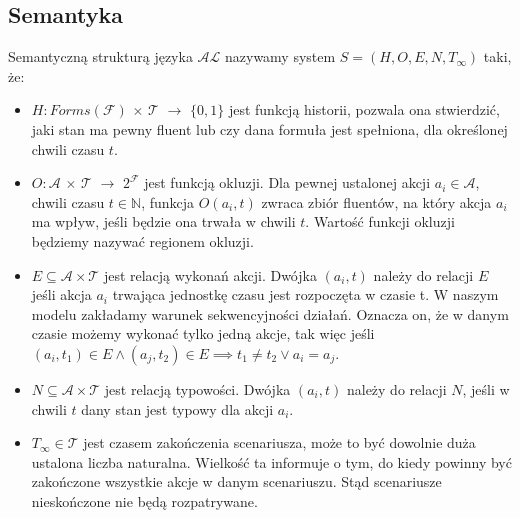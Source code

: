 \subsection{Semantyka}
\begin{definition}
Semantyczną strukturą języka $\mathcal{AL}$ nazywamy system $ S=(H,O,E,N,T_{\infty }) $ taki, że:
	\begin{itemize}
		\item $ H: Forms(\mathcal{F}) $ $\times$ $ \mathcal{T}$ $\longrightarrow$ $\{0,1\}$ jest funkcją historii,
		pozwala ona stwierdzić, jaki stan ma pewny fluent lub czy dana formuła jest spełniona, dla określonej chwili czasu $t$.
		\item $ O: \mathcal{A}$ $\times$ $ \mathcal{T}$ $\longrightarrow$ $2^{\mathcal{F}}$ jest funkcją okluzji.
		Dla pewnej ustalonej akcji $a_i \in \mathcal{A}$, chwili czasu $t\in\mathbb{N}$, funkcja $O(a_i,t) $ zwraca zbiór
		fluentów, na który akcja $a_i$ ma wpływ, jeśli będzie ona trwała w chwili $t$.
Wartość funkcji okluzji będziemy nazywać regionem okluzji.
		\item $E\subseteq \mathcal{A} \times \mathcal{T}$ jest relacją wykonań akcji. Dwójka $(a_i,t)$ należy do relacji
		$E$ jeśli akcja $a_i$ trwająca jednostkę czasu jest rozpoczęta w czasie t. W naszym modelu zakładamy warunek
		sekwencyjności działań. Oznacza on, że w danym czasie możemy wykonać tylko jedną akcje, tak więc jeśli
		$(a_i, t_1) \in E \land (a_j, t_2) \in E \implies t_1 \neq t_2 \lor a_i = a_j$.
		\item $N\subseteq \mathcal{A} \times \mathcal{T}$ jest relacją typowości.
		Dwójka $(a_i,t)$ należy do relacji $N$, jeśli w chwili $t$ dany stan jest typowy dla akcji $a_i$.
		\item $T_{\infty } \in \mathcal{T} $ jest czasem zakończenia scenariusza, może to być dowolnie duża ustalona liczba naturalna.
		Wielkość ta informuje o tym, do kiedy powinny być zakończone wszystkie akcje w danym scenariuszu.
		Stąd scenariusze nieskończone nie będą rozpatrywane.
	\end{itemize}
\end{definition}

